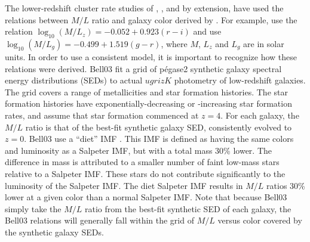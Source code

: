 The lower-redshift cluster rate studies
of \citet{sharon07a}, \citet{sharon10a}, and by
extension, \citet{dilday10a} have used the relations between $M/L$
ratio and galaxy color derived by \citet[][hereafter Bell03]{bell03a}.
For example, \citet{sharon07a} use the relation $\log_{10} (M/L_z) =
-0.052 +0.923(r-i)$ and \citet{sharon10a} use $\log_{10} (M/L_g) =
-0.499 +1.519(g-r)$, where $M$, $L_z$ and $L_g$ are in solar units.
In order to use a consistent model, it is important to recognize how
these relations were derived.  Bell03 fit a grid of {\sc
p{\'e}gase2} \citep{fioc97a} synthetic galaxy spectral energy
distributions (SEDs) to actual $ugrizK$ photometry of low-redshift
galaxies. The grid covers a range of metallicities and star formation
histories. The star formation histories have exponentially-decreasing
or -increasing star formation rates, and assume that star formation
commenced at $z=4$. For each galaxy, the $M/L$ ratio is that of the
best-fit synthetic galaxy SED, consistently evolved to $z=0$.  Bell03
use a ``diet'' \citet{salpeter55a}
IMF \citep[following][]{bell01a}. This IMF is defined as having the
same colors and luminosity as a Salpeter IMF, but with a total mass
30\% lower. The difference in mass is attributed to a smaller number
of faint low-mass stars relative to a Salpeter IMF. These stars do
not contribute significantly to the luminosity of the Salpeter
IMF. The diet Salpeter IMF results in $M/L$ ratios 30\% lower at a
given color than a normal Salpeter IMF. Note that because Bell03
simply take the $M/L$ ratio from the best-fit synthetic SED of each
galaxy, the Bell03 relations will generally fall within the grid of
$M/L$ versus color covered by the synthetic galaxy SEDs.

